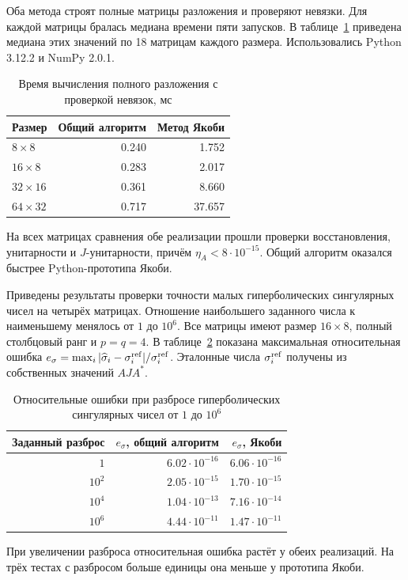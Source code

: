 \documentclass[a4paper,12pt]{article}
\theoremstyle{csstyle}
\begin{document}
Оба метода строят полные матрицы разложения и проверяют невязки.
Для каждой матрицы бралась медиана времени пяти запусков.
В таблице~\ref{tab:comparison} приведена медиана этих значений по 18 матрицам каждого размера.
Использовались Python 3.12.2 и NumPy 2.0.1.

\begin{table}[H]
\centering
\caption{Время вычисления полного разложения с проверкой невязок, мс}
\label{tab:comparison}
\begin{tabular}{@{}lrr@{}}
\toprule
Размер & Общий алгоритм & Метод Якоби\\
\midrule
$8\times8$ & 0.240 & 1.752\\
$16\times8$ & 0.283 & 2.017\\
$32\times16$ & 0.361 & 8.660\\
$64\times32$ & 0.717 & 37.657\\
\bottomrule
\end{tabular}
\end{table}
На всех матрицах сравнения обе реализации прошли проверки восстановления,
унитарности и $J$-унитарности, причём $\eta_A<8\cdot10^{-15}$.
Общий алгоритм оказался быстрее Python-прототипа Якоби.

Приведены результаты проверки точности малых гиперболических сингулярных чисел на четырёх матрицах.
Отношение наибольшего заданного числа к наименьшему менялось от $1$ до $10^6$.
Все матрицы имеют размер $16\times8$, полный столбцовый ранг и $p=q=4$.
В таблице~\ref{tab:accuracy} показана максимальная относительная ошибка
$e_\sigma=\max_i|\widehat\sigma_i-\sigma_i^{\rm ref}|/\sigma_i^{\rm ref}$.
Эталонные числа $\sigma_i^{\rm ref}$ получены из собственных значений
$AJA^*$.

\begin{table}[H]
\centering
\caption{Относительные ошибки при разбросе гиперболических сингулярных чисел от $1$ до $10^6$}
\label{tab:accuracy}
\begin{tabular}{@{}rrr@{}}
\toprule
Заданный разброс & $e_\sigma$, общий алгоритм & $e_\sigma$, Якоби\\
\midrule
$1$ & $6.02\cdot10^{-16}$ & $6.06\cdot10^{-16}$\\
$10^2$ & $2.05\cdot10^{-15}$ & $1.70\cdot10^{-15}$\\
$10^4$ & $1.04\cdot10^{-13}$ & $7.16\cdot10^{-14}$\\
$10^6$ & $4.44\cdot10^{-11}$ & $1.47\cdot10^{-11}$\\
\bottomrule
\end{tabular}
\end{table}
При увеличении разброса относительная ошибка растёт у обеих реализаций.
На трёх тестах с разбросом больше единицы она меньше у прототипа Якоби.
\end{document}
